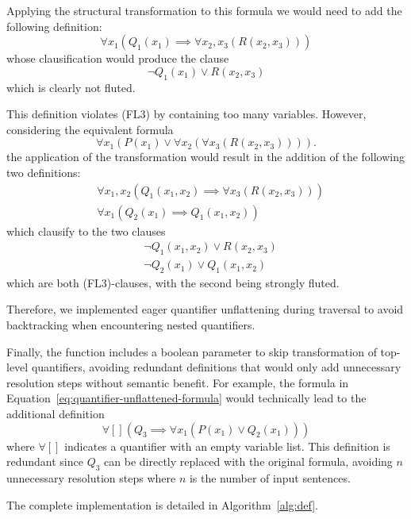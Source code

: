 Applying the structural transformation to this formula we would need to add the following definition:
\[
  \forall x_1 (Q_1(x_1) \implies \forall x_2,x_3 (R(x_2,x_3)))
\]
whose clausification would produce the clause
\[
\neg Q_1(x_1) \lor R(x_2,x_3)
\]
which is clearly not fluted.

This definition violates (FL3) by containing too many variables.
However, considering the equivalent formula
\begin{equation}\label{eq:quantifier-unflattened-formula}
  \forall x_1 (P(x_1) \lor \forall x_2(\forall x_3 (R(x_2,x_3)))).
\end{equation}
the application of the transformation would result in the addition of the following two definitions:
\begin{equation*}
  \begin{aligned}
    &\forall x_1,x_2 (Q_1(x_1,x_2) \implies \forall x_3 (R(x_2,x_3))) \\
    &\forall x_1 (Q_2(x_1) \implies Q_1(x_1,x_2))
  \end{aligned}
\end{equation*}
which clausify to the two clauses
\begin{equation*}
  \begin{aligned}
    &\neg Q_1(x_1,x_2) \lor R(x_2,x_3) \\
    &\neg Q_2(x_1) \lor Q_1(x_1,x_2)
  \end{aligned}
\end{equation*}
which are both (FL3)-clauses, with the second being strongly fluted.

Therefore, we implemented eager quantifier unflattening during traversal to avoid backtracking when encountering nested quantifiers.

Finally, the  function includes a boolean parameter to skip transformation of top-level quantifiers, avoiding redundant definitions that would only add unnecessary resolution steps without semantic benefit.
For example, the formula in Equation~\ref{eq:quantifier-unflattened-formula} would technically lead to the additional definition
\[
  \forall [] (Q_3 \implies \forall x_1 (P(x_1) \lor Q_2(x_1)))
\]
where \(\forall []\) indicates a quantifier with an empty variable list.
This definition is redundant since \(Q_3\) can be directly replaced with the original formula, avoiding \(n\) unnecessary resolution steps where \(n\) is the number of input sentences.

The complete  implementation is detailed in Algorithm~\ref{alg:def}.

